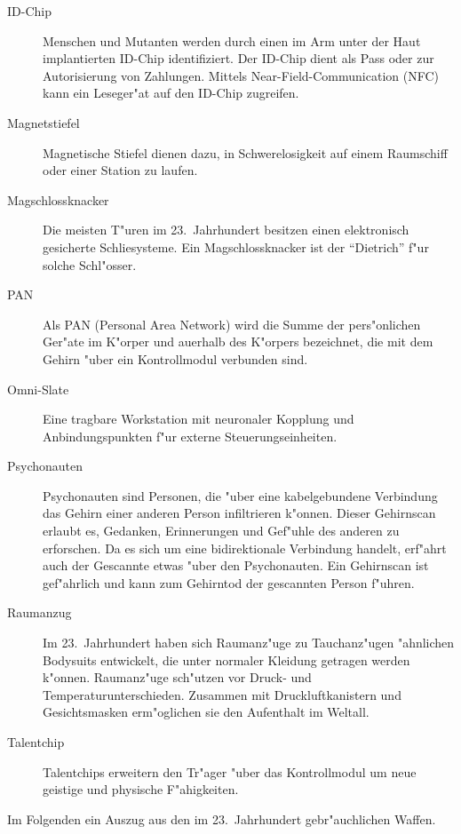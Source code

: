 \begin{description}
\item [ID-Chip] Menschen und Mutanten werden durch einen im Arm unter der Haut implantierten ID-Chip identifiziert. Der ID-Chip dient 
      als Pass oder zur Autorisierung von Zahlungen. Mittels Near-Field-Communication (NFC) kann ein Leseger"at auf den ID-Chip zugreifen.
\item [Magnetstiefel] Magnetische Stiefel dienen dazu, in Schwerelosigkeit auf einem Raumschiff oder einer Station zu laufen.
\item [Magschlossknacker] Die meisten T"uren im 23.~Jahrhundert besitzen einen elektronisch gesicherte Schlie\3systeme. Ein 
      Magschlossknacker ist der ``Dietrich'' f"ur solche Schl"osser.
\item [PAN] Als PAN (Personal Area Network) wird die Summe der pers"onlichen Ger"ate im K"orper und au\3erhalb des K"orpers bezeichnet, 
      die mit dem Gehirn "uber ein Kontrollmodul verbunden sind.
\item [Omni-Slate] Eine tragbare Workstation mit neuronaler Kopplung und Anbindungspunkten f"ur externe Steuerungseinheiten.
\item [Psychonauten] Psychonauten sind Personen, die "uber eine kabelgebundene Verbindung das Gehirn einer anderen Person infiltrieren 
      k"onnen. Dieser Gehirnscan erlaubt es, Gedanken, Erinnerungen und Gef"uhle des anderen zu erforschen. Da es sich um eine bidirektionale Verbindung handelt, erf"ahrt auch der Gescannte etwas "uber den Psychonauten. Ein Gehirnscan ist gef"ahrlich und kann zum Gehirntod der gescannten Person f"uhren.
\item [Raumanzug] Im 23.~Jahrhundert haben sich Raumanz"uge zu Tauchanz"ugen "ahnlichen Bodysuits entwickelt, die unter normaler 
      Kleidung getragen werden k"onnen. Raumanz"uge sch"utzen vor Druck- und Temperaturunterschieden. Zusammen mit Druckluftkanistern und Gesichtsmasken erm"oglichen sie den Aufenthalt im Weltall.
\item [Talentchip] Talentchips erweitern den Tr"ager "uber das Kontrollmodul um neue geistige und physische F"ahigkeiten.
\end{description}


Im Folgenden ein Auszug aus den im 23.~Jahrhundert gebr"auchlichen Waffen.

